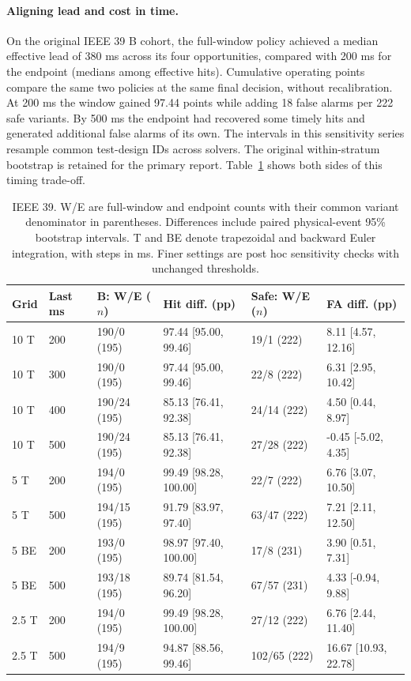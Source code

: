 \documentclass[10pt]{article}
\begin{document}
\paragraph{Aligning lead and cost in time.} On the original IEEE 39 B cohort, the full-window policy achieved a median effective lead of 380 ms across its four opportunities, compared with 200 ms for the endpoint (medians among effective hits). Cumulative operating points compare the same two policies at the same final decision, without recalibration. At 200 ms the window gained 97.44 points while adding 18 false alarms per 222 safe variants. By 500 ms the endpoint had recovered some timely hits and generated additional false alarms of its own. The intervals in this sensitivity series resample common test-design IDs across solvers. The original within-stratum bootstrap is retained for the primary report. Table~\ref{tab:r2time} shows both sides of this timing trade-off.
\begin{table}[htbp]\centering\footnotesize\setlength{\tabcolsep}{4pt}
\caption{IEEE 39. W/E are full-window and endpoint counts with their common variant denominator in parentheses. Differences include paired physical-event 95\% bootstrap intervals. T and BE denote trapezoidal and backward Euler integration, with steps in ms. Finer settings are post hoc sensitivity checks with unchanged thresholds.}\label{tab:r2time}
\begin{tabular}{@{}llllll@{}}
\toprule Grid & Last ms & B: W/E ($n$) & Hit diff. (pp) & Safe: W/E ($n$) & FA diff. (pp) \\\midrule
10 T & 200 & 190/0 (195) & 97.44 [95.00, 99.46] & 19/1 (222) & 8.11 [4.57, 12.16] \\
10 T & 300 & 190/0 (195) & 97.44 [95.00, 99.46] & 22/8 (222) & 6.31 [2.95, 10.42] \\
10 T & 400 & 190/24 (195) & 85.13 [76.41, 92.38] & 24/14 (222) & 4.50 [0.44, 8.97] \\
10 T & 500 & 190/24 (195) & 85.13 [76.41, 92.38] & 27/28 (222) & -0.45 [-5.02, 4.35] \\
5 T & 200 & 194/0 (195) & 99.49 [98.28, 100.00] & 22/7 (222) & 6.76 [3.07, 10.50] \\
5 T & 500 & 194/15 (195) & 91.79 [83.97, 97.40] & 63/47 (222) & 7.21 [2.11, 12.50] \\
5 BE & 200 & 193/0 (195) & 98.97 [97.40, 100.00] & 17/8 (231) & 3.90 [0.51, 7.31] \\
5 BE & 500 & 193/18 (195) & 89.74 [81.54, 96.20] & 67/57 (231) & 4.33 [-0.94, 9.88] \\
2.5 T & 200 & 194/0 (195) & 99.49 [98.28, 100.00] & 27/12 (222) & 6.76 [2.44, 11.40] \\
2.5 T & 500 & 194/9 (195) & 94.87 [88.56, 99.46] & 102/65 (222) & 16.67 [10.93, 22.78] \\
\bottomrule\end{tabular}\end{table}
\end{document}
